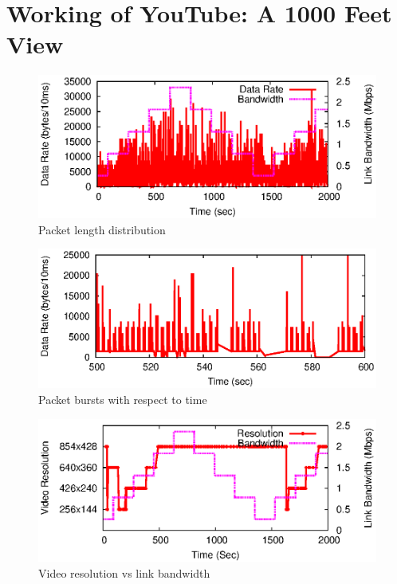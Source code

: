 \section{Working of YouTube: A 1000 Feet View}
\label{sec:overview}

\begin{figure}[!h]
	\centering
	\includegraphics[scale=0.85]{img/burst.eps}
	\caption{Packet length distribution}
	\label{fig:packet}
\end{figure}

\begin{figure}[!h]
	\centering
	\includegraphics[scale=0.85]{img/burst_scale.eps}
	\caption{Packet bursts with respect to time}
	\label{fig:burst}
\end{figure}

\begin{figure}[!h]
	\centering
	\includegraphics[scale=0.85]{img/bw_reso.eps}
	\caption{Video resolution vs link bandwidth}
	\label{fig:reso}
\end{figure}




